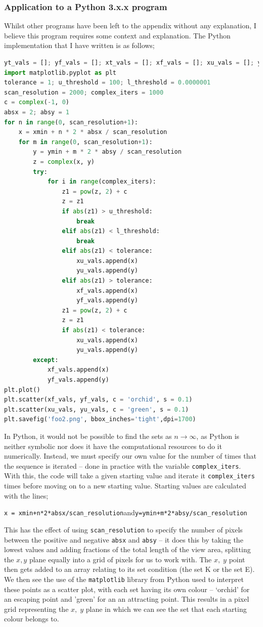 \documentclass[12pt]{article}
\begin{document}
\subsubsection{Application to a Python 3.x.x program}
Whilst other programs have been left to the appendix without any explanation, I believe this program requires some context and explanation.
The Python implementation that I have written is as follows;
	\begin{lstlisting}[language=python]
yt_vals = []; yf_vals = []; xt_vals = []; xf_vals = []; xu_vals = []; yu_vals = []
import matplotlib.pyplot as plt
tolerance = 1; u_threshold = 100; l_threshold = 0.0000001
scan_resolution = 2000; complex_iters = 1000
c = complex(-1, 0)
absx = 2; absy = 1
for n in range(0, scan_resolution+1):
	x = xmin + n * 2 * absx / scan_resolution
	for m in range(0, scan_resolution+1):
		y = ymin + m * 2 * absy / scan_resolution
		z = complex(x, y)
		try:
			for i in range(complex_iters):
				z1 = pow(z, 2) + c
				z = z1
				if abs(z1) > u_threshold:
					break
				elif abs(z1) < l_threshold:
					break
				elif abs(z1) < tolerance:
					xu_vals.append(x)
					yu_vals.append(y)
				elif abs(z1) > tolerance:
					xf_vals.append(x)
					yf_vals.append(y)
				z1 = pow(z, 2) + c
				z = z1
				if abs(z1) < tolerance:
					xu_vals.append(x)
					yu_vals.append(y)
		except:
			xf_vals.append(x)
			yf_vals.append(y)
plt.plot()
plt.scatter(xf_vals, yf_vals, c = 'orchid', s = 0.1)
plt.scatter(xu_vals, yu_vals, c = 'green', s = 0.1)
plt.savefig('foo2.png', bbox_inches='tight',dpi=1700)
	\end{lstlisting}
In Python, it would not be possible to find the sets as $n\rightarrow\infty$, as Python is neither symbolic nor does it have the computational resources to do it numerically. Instead, we must specify our own value for the number of times that the sequence is iterated -- done in practice with the variable \texttt{complex\_iters}. With this, the code will take a given starting value and iterate it \texttt{complex\_iters} times before moving on to a new starting value. Starting values are calculated with the lines;
\begin{center}
	\texttt{x = xmin+n*2*absx/scan\_resolution}\quad and\quad \texttt{y=ymin+m*2*absy/scan\_resolution}
\end{center}
This has the effect of using \texttt{scan\_resolution} to specify the number of pixels between the positive and negative \texttt{absx} and \texttt{absy} -- it does this by taking the lowest values and adding fractions of the total length of the view area, splitting the $x, y$ plane equally into a grid of pixels for us to work with. The $x,\;y$ point then gets added to an array relating to its set condition (the set K or the set E). We then see the use of the \texttt{matplotlib} library from Python used to interpret these points as a scatter plot, with each set having its own colour -- `orchid' for an escaping point and 'green' for an an attracting point. This results in a pixel grid representing the $x,\;y$ plane in which we can see the set that each starting colour belongs to. \\
\end{document}
